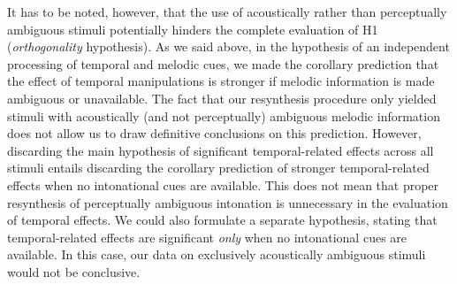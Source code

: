 It has to be noted, however, that the use of acoustically rather than perceptually ambiguous stimuli potentially hinders the complete evaluation of H1 (\textit{orthogonality} hypothesis). As we said above, in the hypothesis of an independent processing of temporal and melodic cues, we made the corollary prediction that the effect of temporal manipulations is stronger if melodic information is made ambiguous or unavailable. The fact that our resynthesis procedure only yielded stimuli with acoustically (and not perceptually) ambiguous melodic information does not allow us to draw definitive conclusions on this prediction. However, discarding the main hypothesis of significant temporal-related effects across all stimuli entails discarding the corollary prediction of stronger temporal-related effects when no intonational cues are available. This does not mean that proper resynthesis of perceptually ambiguous intonation is unnecessary in the evaluation of temporal effects. We could also formulate a separate hypothesis, stating that temporal-related effects are significant \textit{only} when no intonational cues are available. In this case, our data on exclusively acoustically ambiguous stimuli would not be conclusive.
